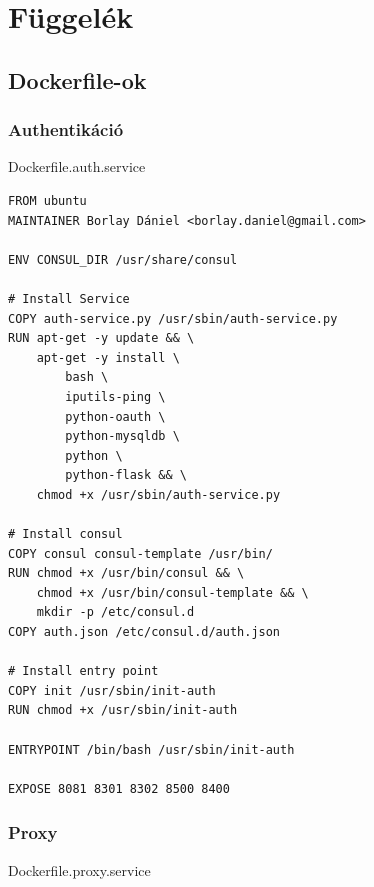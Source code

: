 \documentclass[11pt,magyar,a4paper,twoside,]{report}
\begin{document}
\listoffigures




\appendix

\chapter{Függelék}\label{fuxfcggeluxe9k}

\section{\texorpdfstring{Dockerfile-ok\label{appendix-dockerfile}}{Dockerfile-ok}}\label{dockerfile-ok}

\subsection{Authentikáció}\label{authentikuxe1ciuxf3}

Dockerfile.auth.service

\begin{verbatim}
FROM ubuntu
MAINTAINER Borlay Dániel <borlay.daniel@gmail.com>

ENV CONSUL_DIR /usr/share/consul

# Install Service
COPY auth-service.py /usr/sbin/auth-service.py
RUN apt-get -y update && \
    apt-get -y install \
        bash \
        iputils-ping \
        python-oauth \
        python-mysqldb \
        python \
        python-flask && \
    chmod +x /usr/sbin/auth-service.py

# Install consul
COPY consul consul-template /usr/bin/
RUN chmod +x /usr/bin/consul && \
    chmod +x /usr/bin/consul-template && \
    mkdir -p /etc/consul.d
COPY auth.json /etc/consul.d/auth.json

# Install entry point
COPY init /usr/sbin/init-auth
RUN chmod +x /usr/sbin/init-auth

ENTRYPOINT /bin/bash /usr/sbin/init-auth

EXPOSE 8081 8301 8302 8500 8400
\end{verbatim}

\subsection{Proxy}\label{proxy}

Dockerfile.proxy.service
\end{document}
